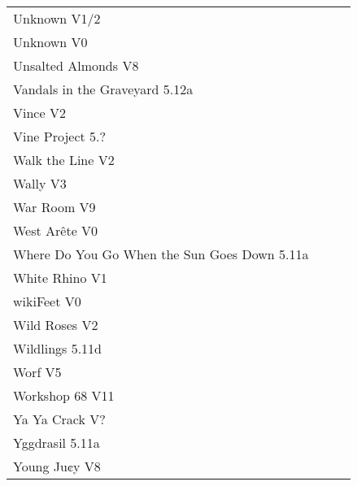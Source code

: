 \begin{flushleft}
\begin{center}
\begin{supertabular}{p{0.76\linewidth}p{0.08\linewidth}}
Unknown V1/2 & \pageref{rt:Unknown on E's Dirty B} \\
Unknown V0 & \pageref{rt:Cuneiform1} \\
Unsalted Almonds V8 & \pageref{rt:Unsalted Almonds} \\
Vandals in the Graveyard 5.12a & \pageref{rt:Vandals in the Graveyard} \\
Vince V2 & \pageref{rt:Vince} \\
Vine Project 5.? & \pageref{rt:Vine Project} \\
Walk the Line V2 & \pageref{rt:Walk the Line} \\
Wally V3 & \pageref{rt:Wally} \\
War Room V9 & \pageref{rt:War Room} \\
West Arête V0 & \pageref{rt:West Arête} \\
Where Do You Go When the Sun Goes Down 5.11a & \pageref{rt:Where Do You Go When the Sun Goes Down} \\
White Rhino V1 & \pageref{rt:White Rhino} \\
wikiFeet V0 & \pageref{rt:wikiFeet} \\
Wild Roses V2 & \pageref{rt:Wild Roses} \\
Wildlings 5.11d & \pageref{rt:Wildlings} \\
Worf V5 & \pageref{rt:Worf} \\
Workshop 68 V11 & \pageref{vr:Workshop 68} \\
Ya Ya Crack V? & \pageref{rt:Ya Ya Crack} \\
Yggdrasil 5.11a & \pageref{rt:Yggdrasil} \\
Young Ju¢y V8 & \pageref{rt:Young Ju¢y} \\
\end{supertabular}
\end{center}
\needspace{1.5cm}

\end{flushleft}
